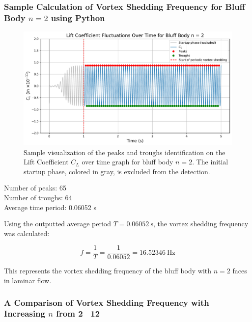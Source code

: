 \subsubsection{Sample Calculation of Vortex Shedding Frequency for Bluff Body $n=2$ using Python}

\begin{figure}[H]
	\centering
	\includegraphics[width=\textwidth]{images/2face_graph_sample_Calc}
	\caption{Sample visualization of the peaks and troughs identification on the Lift Coefficient $C_L$ over time graph for bluff body $n=2$. The initial startup phase, colored in gray, is excluded from the detection.}
	\label{fig:2FaceGraphSampleCalc} 
\end{figure}

\begin{tcolorbox}[title=Python Output,fonttitle=\bfseries,
	colframe=black!75!white,colback=gray!10!white,boxrule=0.5pt,
	fontupper=\ttfamily]
	Number of peaks:    65 \\
	Number of troughs:  64 \\
	
	Average time period: 0.06052 s \\
\end{tcolorbox}

Using the outputted average period $ T = \SI{0.06052}{\second} $, the vortex shedding frequency was calculated:

\[
f = \frac{1}{T} = \frac{1}{0.06052} = \SI{16.52346}{\hertz}
\]

This represents the vortex shedding frequency of the bluff body with $ n = 2 $ faces in laminar flow.

\subsubsection{A Comparison of Vortex Shedding Frequency with Increasing $n$ from 2 \textendash\ 12}

